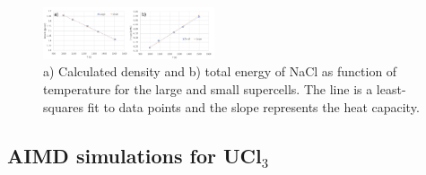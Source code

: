 \documentclass[preprint,3p,10pt,twocolumn,number,sort&compress]{elsarticle}
\begin{document}
\begin{figure}[htb]
\centering
\includegraphics[width=0.45\textwidth]{./figures/FIG3b.pdf}
\caption{a) Calculated density and b) total energy of NaCl as function of temperature for the large and small supercells. The line is a least-squares fit to data points and the slope represents the heat capacity.} 
\label{fig:NaClsize}
\end{figure}


\subsection{AIMD simulations for UCl$_3$}
\end{document}
